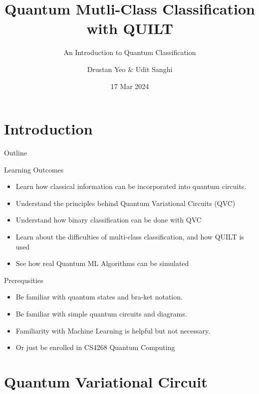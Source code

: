 \documentclass[xcolor=dvipsnames]{beamer}
\title{Quantum Mutli-Class Classification with QUILT}
\subtitle{An Introduction to Quantum Classification}
\author{Drustan Yeo \& Udit Sanghi}
\institute[National University of Singapore] %
{
  Department of Computer Science\\
  National University of Singapore
}
\date{17 Mar 2024}
\begin{document}
\begin{frame}
  \titlepage
\end{frame}

\section{Introduction}

\begin{frame}{Outline}
  \tableofcontents
\end{frame}


\begin{frame}{Learning Outcomes}
  \begin{itemize}[<+- | alert@+>]
  \item {
    Learn how classical information can be incorporated into quantum circuits.
  }
  \item {
    Understand the principles behind Quantum Variational Circuits (QVC)
  }
  \item {
    Understand how binary classification can be done with QVC
  }
  \item {
    Learn about the difficulties of multi-class classification, and how QUILT is used
  }
  \item {
    See how real Quantum ML Algorithms can be simulated
  }
  \end{itemize}
\end{frame}

\begin{frame}{Prerequsities}
  \begin{itemize}
  \item {
    Be familiar with quantum states and bra-ket notation.
  }
  \item {
    Be familiar with simple quantum circuits and diagrams.
  }
  \item {
    Familiarity with Machine Learning is helpful but not necessary.
  }
  \item<2-> {
    \alert<2>{Or just be enrolled in
    CS4268 Quantum Computing}
  }
  \end{itemize}
\end{frame}

\section{Quantum Variational Circuit}
\end{document}
